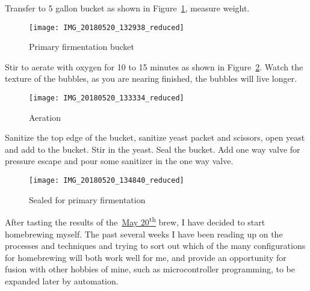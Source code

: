 \FloatBarrier{}
\clearpage
\FloatBarrier{}

Transfer to 5 gallon bucket as shown in Figure~\ref{fig:primary}, measure weight.

\begin{figure}[H]
  \centering
  \texttt{[image: IMG\_20180520\_132938\_reduced]}
  \caption{Primary firmentation bucket}\label{fig:primary}
\end{figure}

\FloatBarrier{}
\FloatBarrier{}

Stir to aerate with oxygen for 10 to 15 minutes as shown in Figure~\ref{fig:aeration}. Watch the texture of the bubbles, as you are nearing finished, the bubbles will live longer.

\begin{figure}[H]
  \centering
  \texttt{[image: IMG\_20180520\_133334\_reduced]}
  \caption{Aeration}\label{fig:aeration}
\end{figure}

\FloatBarrier{}
\FloatBarrier{}

Sanitize the top edge of the bucket, sanitize yeast packet and scissors, open yeast and add to the bucket.  Stir in the yeast. Seal the bucket. Add one way valve for pressure escape and pour some sanitizer in the one way valve.

\begin{figure}[H]
  \centering
  \texttt{[image: IMG\_20180520\_134840\_reduced]}
  \caption{Sealed for primary firmentation}\label{fig:sealed}
\end{figure}


\FloatBarrier{}

After tasting the results of the~\hyperref[20180520]{May 20\textsuperscript{th}} brew, I have decided to start homebrewing myself.  The past several weeks I have been reading up on the processes and techniques and trying to sort out which of the many configurations for homebrewing will both work well for me, and provide an opportunity for fusion with other hobbies of mine, such as microcontroller programming, to be expanded later by automation.

